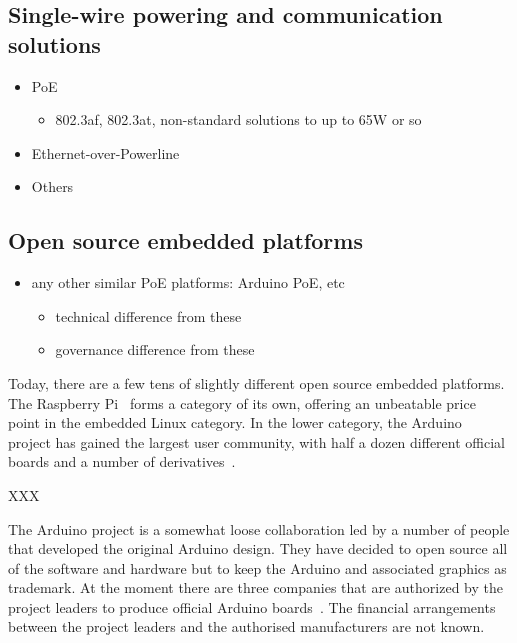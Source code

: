 \documentclass[final]{siamltex}
\begin{document}
\subsection{Single-wire powering and communication solutions}

\begin{itemize}
  \item PoE
    \begin{itemize}
    \item 802.3af, 802.3at, non-standard solutions to up to 65W or so
    \end{itemize}
  \item Ethernet-over-Powerline
  \item Others
\end{itemize}
 
\subsection{Open source embedded platforms}

\begin{itemize}
  \item any other similar PoE platforms: Arduino PoE, etc
    \begin{itemize}
    \item technical difference from these
    \item governance difference from these
    \end{itemize}
\end{itemize}

Today, there are a few tens of slightly different open source embedded
platforms.  The Raspberry Pi~\cite{RasPi} forms a category of its own,
offering an unbeatable price point in the embedded Linux category.  In
the lower category, the Arduino~\cite{ArduinoProject,hribernik2011co}
project has gained the largest user community, with half a dozen
different official boards and a number of derivatives~\cite{XXX}.

XXX

The Arduino project is a somewhat loose collaboration led by a number of
people that developed the original Arduino design.  They have decided
to open source all of the software and hardware but to keep the
Arduino and associated graphics as trademark.  At the moment there are
three companies that are authorized by the project leaders to produce
official Arduino boards~\cite{ArduinoPolicy}.  The financial
arrangements between the project leaders and the authorised
manufacturers are not known.
\end{document}
